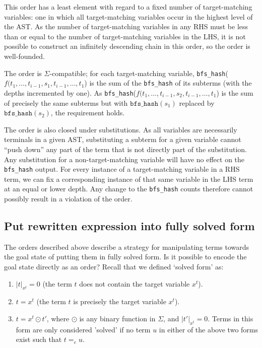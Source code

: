 This order has a least element with regard to a fixed number of target-matching variables: one in which all target-matching variables occur in the highest level of the AST. As the number of target-matching variables in any RHS must be less than or equal to the number of target-matching variables in the LHS, it is not possible to construct an infinitely descending chain in this order, so the order is well-founded.

The order is $\Sigma$-compatible; for each target-matching variable, \texttt{bfs_hash}($f(t_1,\dots,t_{i-1},s_1,t_{i-1},\dots,t_1$) is the sum of the \texttt{bfs_hash} of its subterms (with the depths incremented by one). As \texttt{bfs_hash}($f(t_1,\dots,t_{i-1},s_2,t_{i-1},\dots,t_1$) is the sum of precisely the same subterms but with $\texttt{bfs_hash}(s_1)$ replaced by $\texttt{bfs_hash}(s_2)$, the requirement holds.

The order is also closed under substitutions. As all variables are necessarily terminals in a given AST, substituting a subterm for a given variable cannot ``push down'' any part of the term that is not directly part of the substitution. Any substitution for a non-target-matching variable will have no effect on the \texttt{bfs_hash} output. For every instance of a target-matching variable in a RHS term, we can fix a corresponding instance of that same variable in the LHS term at an equal or lower depth. Any change to the \texttt{bfs_hash} counts therefore cannot possibly result in a violation of the order.

\subsection{Put rewritten expression into fully solved form}

The orders described above describe a strategy for manipulating terms towards the goal state of putting them in fully solved form. Is it possible to encode the goal state directly as an order? Recall that we defined `solved form' as:

\begin{enumerate}
  \item $|t|_{x^t} = 0$ (the term $t$ does not contain the target variable $x^t$).
  \item $t = x^t$ (the term $t$ is precisely the target variable $x^t$).
  \item $t = x^t \odot t'$, where $\odot$ is any binary function in $\Sigma$, and $|t'|_{x^t} = 0$. Terms in this form are only considered 'solved' if no term $u$ in either of the above two forms exist such that $t =_e u$.
\end{enumerate}

